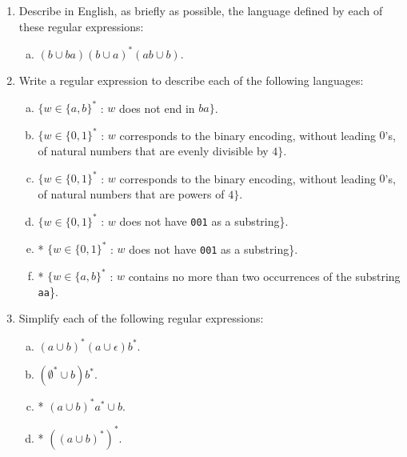 \documentclass[10pt]{article}
\begin{document}
\begin{enumerate}[1)]

\item
Describe in English, as briefly as possible, the language defined by each of these regular expressions:
\begin{enumerate}[a)]
\item
$(b \cup ba) (b \cup a)^* (ab \cup b)$.
\end{enumerate}


\item
Write a regular expression to describe each of the following languages:
\begin{enumerate}[a)]
\addtocounter{enumii}{1}
\item
$\{w \in \{a, b\}^*$ : $w$ does not end in $ba\}$.

\addtocounter{enumii}{1}
\item
$\{w \in \{0, 1\}^*$ : $w$ corresponds to the binary encoding, without leading $0$'s, of natural numbers that are evenly divisible by $4\}$.

\item
$\{w \in \{0, 1\}^*$ : $w$ corresponds to the binary encoding, without leading $0$'s, of natural numbers that are powers of $4\}$.

\addtocounter{enumii}{2}
\item
$\{w \in \{0, 1\}^*$ : $w$ does not have \texttt{001} as a substring\}.

\addtocounter{enumii}{7}
\item
* $\{w \in \{0, 1\}^*$ : $w$ does not have \texttt{001} as a substring\}.

\item
* $\{w \in \{a, b\}^*$ : $w$ contains no more than two occurrences of the substring \texttt{aa}\}.
\end{enumerate}

\item
Simplify each of the following regular expressions:
\begin{enumerate}[a)]
\item
$(a \cup b)^* (a \cup \epsilon) b^*$.

\item
$(\emptyset ^* \cup b) b^*$.

\item
* $(a \cup b)^*a^* \cup b$.

\item
* $((a \cup b)^*)^*$.


\end{enumerate}
\end{enumerate}
\end{document}
